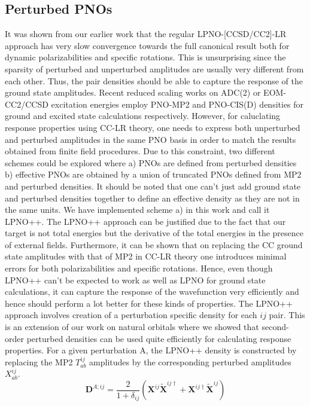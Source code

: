 \subsection{Perturbed PNOs}
It was shown from our earlier work that the regular LPNO-[CCSD/CC2]-LR approach has
very slow convergence towards the full canonical result both for dynamic polarizabilities
and specific rotations\cite{}. This is unsurprising since the sparsity of perturbed 
and unperturbed amplitudes are usually very different from each other. Thus, the 
pair densities should be able to capture the response of the ground state amplitudes. 
Recent reduced scaling works on ADC(2) or EOM-CC2/CCSD excitation energies employ 
PNO-MP2 and PNO-CIS(D) densities for ground and excited state calculations respectively.\cite{}
However, for caluclating response properties using CC-LR theory, one needs to express both 
unperturbed and perturbed amplitudes in the same PNO basis in order to match the results
obtained from finite field procedures. Due to this constraint, two different 
schemes could be explored where a) PNOs are defined from perturbed densities b) effective PNOs 
are obtained by a union of truncated PNOs defined from MP2 and perturbed densities. It should
be noted that one can't just add ground state and perturbed densities together to define an effective
density as they are not in the same units. We have implemented scheme a) in this work and call it LPNO++.
The LPNO++ approach can be justified due to the fact that our target is not total energies but the 
derivative of the total energies in the presence of external fields. Furthermore, it can
be shown that on replacing the CC ground state amplitudes with that of MP2 in CC-LR theory
one introduces minimal errors for both polarizabilities and specific rotations.\cite{} 
Hence, even though LPNO++ can't be expected to work as well as LPNO for ground state 
calculations, it can capture the response of the wavefunction very efficiently and 
hence should perform a lot better for these kinds of properties. The LPNO++ approach
involves creation of a perturbation specific density for each $ij$ pair. 
This is an extension of our work on natural orbitals where we showed that second-order
perturbed densities can be used quite efficiently for calculating response properties\cite{}.
For a given perturbation A, the LPNO++ density is constructed by replacing the MP2 
$T^{ij}_{ab}$ amplitudes by the corresponding perturbed amplitudes $X^{ij}_{ab}$.
\begin{equation}
\bm{D}^{A;ij} = \frac{2}{1+\delta_{ij}} (\bm{X}^{ij}\bm{\tilde{X}}^{ij\dagger} + \bm{X}^{ij\dagger}\bm{\tilde{X}}^{ij})
\end{equation}
